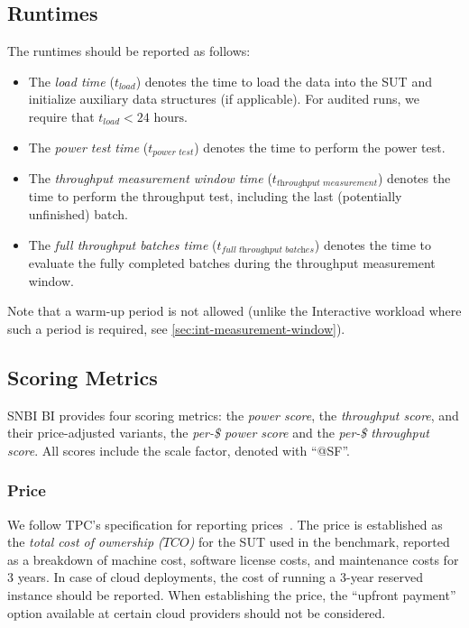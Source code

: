 \subsection{Runtimes}

The runtimes should be reported as follows:

\begin{itemize}
    \item The \emph{load time} ($t_\textit{load}$) denotes the time to load the data into the SUT and initialize auxiliary data structures (if applicable). For audited runs, we require that $t_\textit{load} < 24\textrm{ hours}$.
    \item The \emph{power test time} ($t_\textit{power test}$) denotes the time to perform the power test.
    \item The \emph{throughput measurement window time} ($t_\textit{throughput\ measurement}$) denotes the time to perform the throughput test, including the last (potentially unfinished) batch.
    \item The \emph{full throughput batches time} ($t_\textit{full\ throughput\ batches}$) denotes the time to evaluate the fully completed batches during the throughput measurement window.
\end{itemize}

Note that a warm-up period is not allowed (unlike the Interactive workload where such a period is required, see \autoref{sec:int-measurement-window}).

\subsection{Scoring Metrics}
\label{sec:bi-scoring-metrics}

SNBI BI provides four scoring metrics:
the \emph{power score}, the \emph{throughput score}, and their price-adjusted variants,
the \emph{per-\$ power score} and the \emph{per-\$ throughput score}.
All scores include the scale factor, denoted with ``@SF''.

\subsubsection{Price}
\label{sec:price-metrics}

We follow TPC's specification for reporting prices~\cite{tpc-pricing}.
The price is established as the \emph{total cost of ownership ($\textit{TCO}$)} for the SUT used in the benchmark,
reported as a breakdown of
machine cost,
software license costs,
and maintenance costs for 3 years.
In case of cloud deployments, the cost of running a 3-year reserved instance should be reported.
When establishing the price, the ``upfront payment'' option available at certain cloud providers should not be considered.

